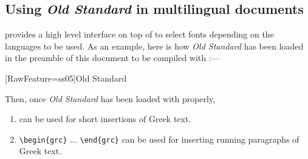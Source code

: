 \subsection{Using \emph{Old Standard} in multilingual
  documents}
\label{sec:using-old-standard}
 provides a high level interface on top of 
to select fonts depending on the languages to be used. As an example,
here is how \emph{Old Standard} has been loaded in the preamble of
this document to be compiled with \LuaLaTeX:---
\begin{code}
  \usepackage{fontspec}
  \usepackage[greek.ancient,english]{babel}
  
  [RawFeature=ss05]{Old Standard}
\end{code}

Then, once \emph{Old Standard} has been loaded with 
properly,
\begin{enumerate}
\item {} can be used for short insertions
  of Greek text.
\item \verb|\begin{grc}| ... \verb|\end{grc}| can be used for
  inserting running paragraphs of Greek text.
\end{enumerate}


